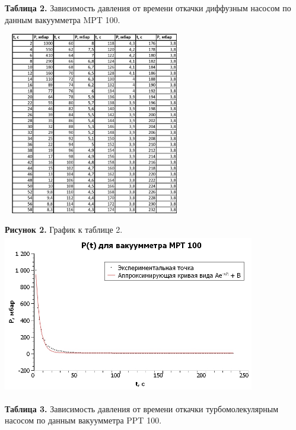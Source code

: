 \documentclass[15pt,a5paper,reqno]{article}
\begin{document}
    \newpage
    \noindent\textbf{Таблица 2.} Зависимость давления от времени откачки диффузным насосом по данным вакуумметра MPT 100.
    
    \centering\includegraphics[width = 8cm, height = 8cm]{Диффузный насос, MPT 100_page-0001.jpg}
    
    \newpage
    \noindent\textbf{Рисунок 2.} График к таблице 2.
    \includegraphics[width = 11cm, height = 7cm]{Диффузный насос, MPT 100.jpg}
    
    \newpage
    \noindent\textbf{Таблица 3.} Зависимость давления от времени откачки турбомолекулярным насосом по данным вакуумметра PPT 100.
    
\end{document}
